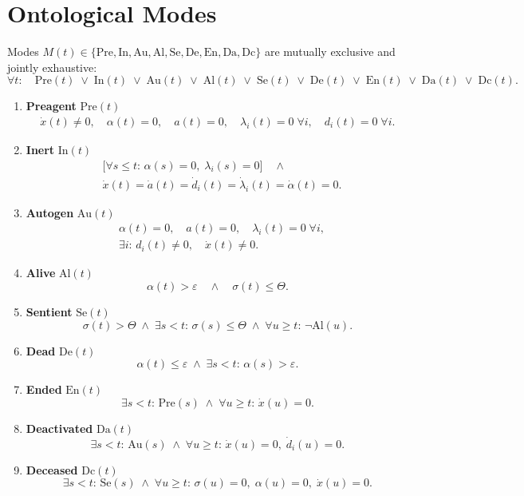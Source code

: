 \documentclass{article}
\begin{document}
\section{Ontological Modes}
Modes $M(t)\in\{\mathrm{Pre},\mathrm{In},\mathrm{Au},\mathrm{Al},\mathrm{Se},\mathrm{De},\mathrm{En},\mathrm{Da},\mathrm{Dc}\}$ are mutually exclusive and jointly exhaustive:
\[
\forall t:\quad \mathrm{Pre}(t)\;\lor\;\mathrm{In}(t)\;\lor\;\mathrm{Au}(t)\;\lor\;\mathrm{Al}(t)\;\lor\;\mathrm{Se}(t)\;\lor\;\mathrm{De}(t)\;\lor\;\mathrm{En}(t)\;\lor\;\mathrm{Da}(t)\;\lor\;\mathrm{Dc}(t).
\]
\begin{enumerate}
  \item \textbf{Preagent} $\mathrm{Pre}(t)$
  \[
  \begin{aligned}
  \dot x(t)\neq0,\quad
  \alpha(t)=0,\quad
  a(t)=0,\quad
  \lambda_i(t)=0\;\forall i,\quad
  d_i(t)=0\;\forall i.
  \end{aligned}
  \]

  \item \textbf{Inert} $\mathrm{In}(t)$
  \[
  \begin{aligned}
  &\bigl[\forall s\le t:\,\alpha(s)=0,\;\lambda_i(s)=0\bigr]\quad\land\\
  &\dot x(t)=\dot a(t)=\dot d_i(t)=\dot\lambda_i(t)=\dot\alpha(t)=0.
  \end{aligned}
  \]

  \item \textbf{Autogen} $\mathrm{Au}(t)$
  \[
  \begin{aligned}
  &\alpha(t)=0,\quad a(t)=0,\quad \lambda_i(t)=0\;\forall i,\\
  &\exists i:\,d_i(t)\neq0,\quad \dot x(t)\neq0.
  \end{aligned}
  \]

  \item \textbf{Alive} $\mathrm{Al}(t)$
  \[
  \alpha(t)>\varepsilon\quad\land\quad\sigma(t)\le\Theta.
  \]

  \item \textbf{Sentient} $\mathrm{Se}(t)$
  \[
  \sigma(t)>\Theta\;\land\;\exists s<t:\,\sigma(s)\le\Theta\;\land\;\forall u\ge t:\,\neg\mathrm{Al}(u).
  \]

  \item \textbf{Dead} $\mathrm{De}(t)$
  \[
  \alpha(t)\le\varepsilon\;\land\;\exists s<t:\,\alpha(s)>\varepsilon.
  \]

  \item \textbf{Ended} $\mathrm{En}(t)$
  \[
  \exists s<t:\,\mathrm{Pre}(s)\;\land\;\forall u\ge t:\,\dot x(u)=0.
  \]

  \item \textbf{Deactivated} $\mathrm{Da}(t)$
  \[
  \exists s<t:\,\mathrm{Au}(s)\;\land\;\forall u\ge t:\,\dot x(u)=0,\;\dot d_i(u)=0.
  \]

  \item \textbf{Deceased} $\mathrm{Dc}(t)$
  \[
  \exists s<t:\,\mathrm{Se}(s)\;\land\;\forall u\ge t:\,\sigma(u)=0,\;\alpha(u)=0,\;\dot x(u)=0.
  \]
\end{enumerate}
\end{document}
